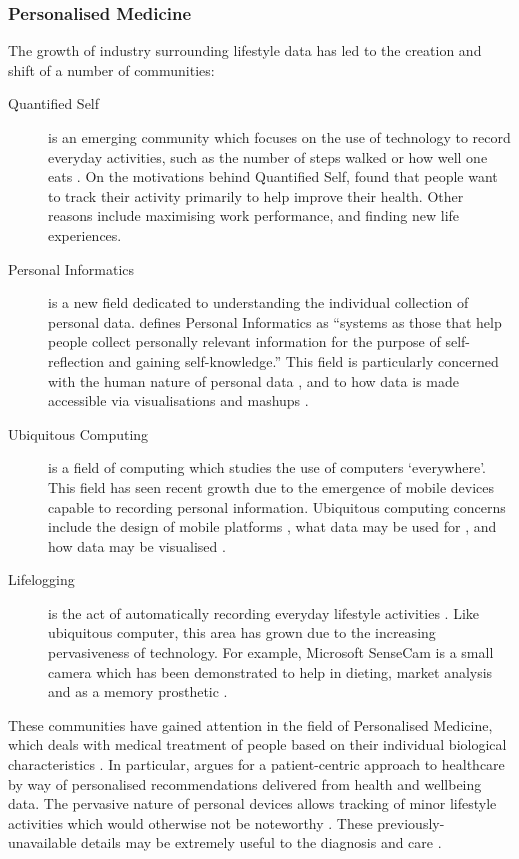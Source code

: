 \documentclass[a4paper]{scrartcl}     %
\begin{document}
    \subsubsection{Personalised Medicine}

      The growth of industry surrounding lifestyle data has led to the creation and shift of a number of communities:
      \begin{description}
        \item[Quantified Self] is an emerging community which focuses on the use of technology to record everyday activities, such as the number of steps walked or how well one eats \citep{Choe2014}. On the motivations behind Quantified Self, \citet{Choe2014} found that people want to track their activity primarily to help improve their health. Other reasons include maximising work performance, and finding new life experiences.

        \item[Personal Informatics] is a new field dedicated to understanding the individual collection of personal data. \citet{Li2010} defines Personal Informatics as ``systems as those that help people collect personally relevant information for the purpose of self-reflection and gaining self-knowledge.'' This field is particularly concerned with the human nature of personal data \citep{Rooksby2014}, and to how data is made accessible via visualisations and mashups \citep{Bentley2013}.

        \item[Ubiquitous Computing] is a field of computing which studies the use of computers `everywhere'. This field has seen recent growth due to the emergence of mobile devices capable to recording personal information. Ubiquitous computing concerns include the design of mobile platforms \citep{Gurrin2013}, what data may be used for \citep{Li2011}, and how data may be visualised \citep{Lee2014}.

        \item[Lifelogging] is the act of automatically recording everyday lifestyle activities \citep{Doherty2011}. Like ubiquitous computer, this area has grown due to the increasing pervasiveness of technology. For example, Microsoft SenseCam is a small camera which has been demonstrated to help in dieting, market analysis and as a memory prosthetic \citep{Doherty2011,Doherty2013}.
      \end{description}

      These communities have gained attention in the field of Personalised Medicine, which deals with medical treatment of people based on their individual biological characteristics \citep{Swan2009}. In particular, \citet{Swan2012} argues for a patient-centric approach to healthcare by way of personalised recommendations delivered from health and wellbeing data. The pervasive nature of personal devices allows tracking of minor lifestyle activities which would otherwise not be noteworthy \citep{Rooksby2014}. These previously-unavailable details may be extremely useful to the diagnosis and care \citep{Swan2012}.
\end{document}
